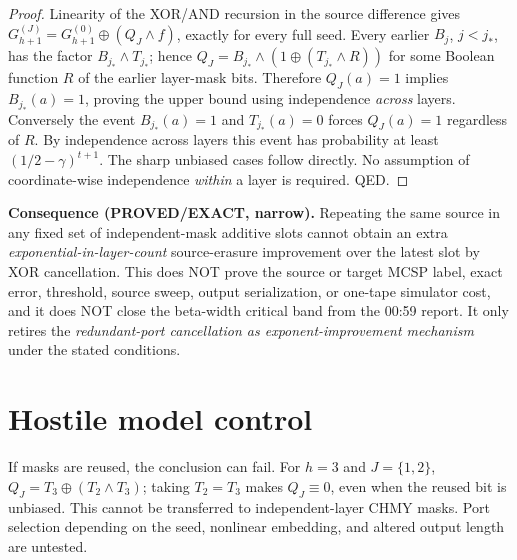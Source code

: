 \documentclass[11pt]{article}
\begin{document}
\begin{proof}
Linearity of the XOR/AND recursion in the source difference gives
$G_{h+1}^{(J)}=G_{h+1}^{(0)}\oplus (Q_J\wedge f)$, exactly for every full seed. Every earlier $B_j$, $j<j_*$, has the factor $B_{j_*}\wedge T_{j_*}$; hence $Q_J=B_{j_*}\wedge(1\oplus(T_{j_*}\wedge R))$ for some Boolean function $R$ of the earlier layer-mask bits. Therefore $Q_J(a)=1$ implies $B_{j_*}(a)=1$, proving the upper bound using independence \emph{across} layers. Conversely the event $B_{j_*}(a)=1$ and $T_{j_*}(a)=0$ forces $Q_J(a)=1$ regardless of $R$. By independence across layers this event has probability at least $(1/2-\gamma)^{t+1}$. The sharp unbiased cases follow directly. No assumption of coordinate-wise independence \emph{within} a layer is required. QED.
\end{proof}

\noindent\textbf{Consequence (PROVED/EXACT, narrow).} Repeating the same source in any fixed set of independent-mask additive slots cannot obtain an extra \emph{exponential-in-layer-count} source-erasure improvement over the latest slot by XOR cancellation. This does NOT prove the source or target MCSP label, exact error, threshold, source sweep, output serialization, or one-tape simulator cost, and it does NOT close the beta-width critical band from the 00:59 report. It only retires the \emph{redundant-port cancellation as exponent-improvement mechanism} under the stated conditions.

\section*{Hostile model control}
If masks are reused, the conclusion can fail. For $h=3$ and $J=\{1,2\}$, $Q_J=T_3\oplus(T_2\wedge T_3)$; taking $T_2=T_3$ makes $Q_J\equiv0$, even when the reused bit is unbiased. This cannot be transferred to independent-layer CHMY masks. Port selection depending on the seed, nonlinear embedding, and altered output length are untested.
\end{document}

